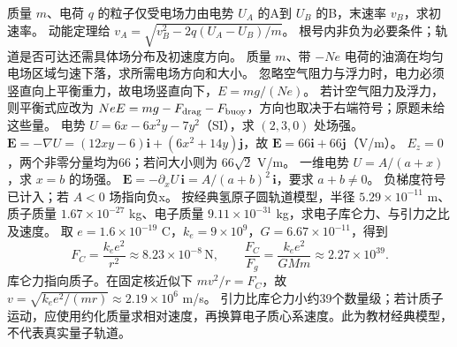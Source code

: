 \problemtext 质量 $m$、电荷 $q$ 的粒子仅受电场力由电势 $U_A$ 的A到 $U_B$ 的B，末速率 $v_B$，求初速率。
\workings 动能定理给 $v_A=\sqrt{v_B^2-2q(U_A-U_B)/m}$。
\crosscheck 根号内非负为必要条件；轨道是否可达还需具体场分布及初速度方向。
\problemtext 质量 $m$、带 $-Ne$ 电荷的油滴在均匀电场区域匀速下落，求所需电场方向和大小。
\workings 忽略空气阻力与浮力时，电力必须竖直向上平衡重力，故电场竖直向下，$E=mg/(Ne)$。
\crosscheck 若计空气阻力及浮力，则平衡式应改为 $NeE=mg-F_{\rm drag}-F_{\rm buoy}$，方向也取决于右端符号；原题未给这些量。
\problemtext 电势 $U=6x-6x^2y-7y^2$（SI），求 $(2,3,0)$ 处场强。
\workings $\bm E=-\nabla U=(12xy-6)\bm i+(6x^2+14y)\bm j$，故 $\bm E=66\bm i+66\bm j$（V/m）。
\crosscheck $E_z=0$，两个非零分量均为66；若问大小则为 $66\sqrt2$ V/m。
\problemtext 一维电势 $U=A/(a+x)$，求 $x=b$ 的场强。
\workings $\bm E=-\partial_xU\,\bm i=A/(a+b)^2\,\bm i$，要求 $a+b\ne0$。
\crosscheck 负梯度符号已计入；若 $A<0$ 场指向负x。
\problemtext 按经典氢原子圆轨道模型，半径 $5.29\times10^{-11}$ m、质子质量 $1.67\times10^{-27}$ kg、电子质量 $9.11\times10^{-31}$ kg，求电子库仑力、与引力之比及速度。
\workings 取 $e=1.6\times10^{-19}$ C，$k_e=9\times10^9$，$G=6.67\times10^{-11}$，得到
\[
F_C=\frac{k_ee^2}{r^2}\approx8.23\times10^{-8}\,\mathrm N,\qquad
\frac{F_C}{F_g}=\frac{k_ee^2}{GMm}\approx2.27\times10^{39}.
\]
库仑力指向质子。在固定核近似下 $mv^2/r=F_C$，故 $v=\sqrt{k_ee^2/(mr)}\approx2.19\times10^6$ m/s。
\crosscheck 引力比库仑力小约39个数量级；若计质子运动，应使用约化质量求相对速度，再换算电子质心系速度。此为教材经典模型，不代表真实量子轨道。

